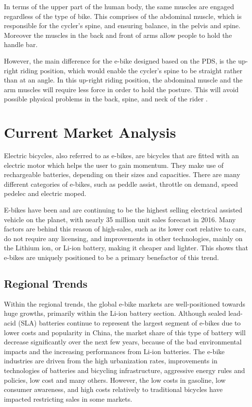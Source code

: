 \documentclass[a4paper,11pt]{article}
\begin{document}
In terms of the upper part of the human body, the same muscles are engaged regardless of the type of bike. This comprises of the abdominal muscle, which is responsible for the cycler's spine, and ensuring balance, in the pelvis and spine. Moreover the muscles in the back and front of arms allow people to hold the handle bar. 

However, the main difference for the e-bike designed based on the PDS, is the up-right riding position, which would enable the cycler's spine to be straight rather than at an angle. In this up-right riding position, the abdominal muscle and the arm muscles will require less force in order to hold the posture. This will avoid possible physical problems in the back, spine, and neck of the rider \cite{schwell05}.

\section{Current Market Analysis}

Electric bicycles, also referred to as e-bikes, are bicycles that are fitted with an electric motor which helps the user to gain momentum. They make use of rechargeable batteries, depending on their sizes and capacities. There are many different categories of e-bikes, such as peddle assist, throttle on demand, speed pedelec and electric moped.

E-bikes have been and are continuing to be the highest selling electrical assisted vehicle on the planet, with nearly 35 million unit sales forecast in 2016. Many factors are behind this reason of high-sales, such as its lower cost relative to cars, do not require any licensing, and improvements in other technologies, mainly on the Lithium ion, or Li-ion battery, making it cheaper and lighter. This shows that e-bikes are uniquely positioned to be a primary benefactor of this trend.

\subsection{Regional Trends}

Within the regional trends, the global e-bike markets are well-positioned towards huge growths, primarily within the Li-ion battery section. Although sealed lead-acid (SLA) batteries continue to represent the largest segment of e-bikes due to lower costs and popularity in China, the market share of this type of battery will decrease significantly over the next few years, because of the bad environmental impacts and the increasing performances from Li-ion batteries. The e-bike industries are driven from the high urbanization rates, improvements in technologies of batteries and bicycling infrastructure, aggressive energy rules and policies, low cost and many others. However, the low costs in gasoline, low consumer awareness, and high costs relatively to traditional bicycles have impacted restricting sales in some markets.
\end{document}
